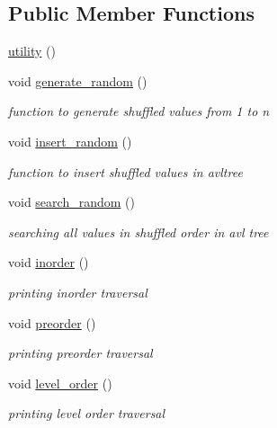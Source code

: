 \subsection*{Public Member Functions}
\begin{DoxyCompactItemize}
\item 
\hyperlink{class_btreehash_1_1utility_a9b8af0d9c52b2ca0aa991851d1ff1ed2}{utility} ()
\item 
void \hyperlink{class_btreehash_1_1utility_acee49704cdc53cc825c099ac2fa42a0a}{generate\-\_\-random} ()
\begin{DoxyCompactList}\small\item\em function to generate shuffled values from 1 to n \end{DoxyCompactList}\item 
void \hyperlink{class_btreehash_1_1utility_ae303164ff37c0be48561b504a69826d2}{insert\-\_\-random} ()
\begin{DoxyCompactList}\small\item\em function to insert shuffled values in avltree \end{DoxyCompactList}\item 
void \hyperlink{class_btreehash_1_1utility_afbdedf1fc9e3c921a41023c0a630160e}{search\-\_\-random} ()
\begin{DoxyCompactList}\small\item\em searching all values in shuffled order in avl tree \end{DoxyCompactList}\item 
void \hyperlink{class_btreehash_1_1utility_a6b65ef83e80bb1a03cb5847f92bd206c}{inorder} ()
\begin{DoxyCompactList}\small\item\em printing inorder traversal \end{DoxyCompactList}\item 
void \hyperlink{class_btreehash_1_1utility_aa6a843c436832c60dd4b1638ea09c133}{preorder} ()
\begin{DoxyCompactList}\small\item\em printing preorder traversal \end{DoxyCompactList}\item 
void \hyperlink{class_btreehash_1_1utility_aa02c94146409284142a0be07c4c2f3b2}{level\-\_\-order} ()
\begin{DoxyCompactList}\small\item\em printing level order traversal \end{DoxyCompactList}\item 

\end{DoxyCompactItemize}

